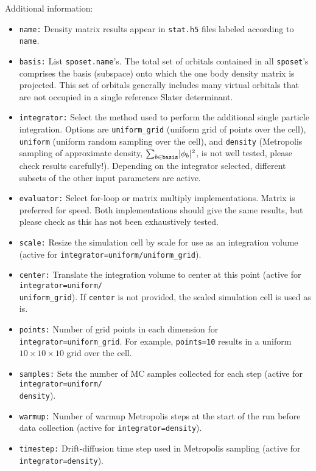 Additional information:
\begin{itemize}
  \item{\texttt{name:} Density matrix results appear in \texttt{stat.h5} files labeled according to \texttt{name}.}
  \item{\texttt{basis:} List \texttt{sposet.name}'s.  The total set of orbitals contained in all \texttt{sposet}'s comprises the basis (subspace) onto which the one body density matrix is projected.  This set of orbitals generally includes many virtual orbitals that are not occupied in a single reference Slater determinant.}
  \item{\texttt{integrator:} Select the method used to perform the additional single particle integration.  Options are \texttt{uniform\_grid} (uniform grid of points over the cell), \texttt{uniform} (uniform random sampling over the cell), and \texttt{density} (Metropolis sampling of approximate density, $\sum_{b\in \texttt{basis}}\abs{\phi_b}^2$, is not well tested, please check results carefully!)}.  Depending on the integrator selected, different subsets of the other input parameters are active.
  \item{\texttt{evaluator:} Select for-loop or matrix multiply implementations.  Matrix is preferred for speed.  Both implementations should give the same results, but please check as this has not been exhaustively tested.}
  \item{\texttt{scale:} Resize the simulation cell by scale for use as an integration volume (active for \texttt{integrator=uniform/uniform\_grid}).}
  \item{\texttt{center:} Translate the integration volume to center at this point (active for \texttt{integrator=uniform/\\uniform\_grid}). If \texttt{center} is not provided, the scaled simulation cell is used as is. }
  \item{\texttt{points:} Number of grid points in each dimension for \texttt{integrator=uniform\_grid}.  For example, \texttt{points=10} results in a uniform $10 \times 10 \times 10$ grid over the cell.}
  \item{\texttt{samples:} Sets the number of MC samples collected for each step (active for \texttt{integrator=uniform/\\density}).  }
  \item{\texttt{warmup:} Number of warmup Metropolis steps at the start of the run before data collection (active for \texttt{integrator=density}). }
  \item{\texttt{timestep:} Drift-diffusion time step used in Metropolis sampling (active for \texttt{integrator=density}).}

\end{itemize}
